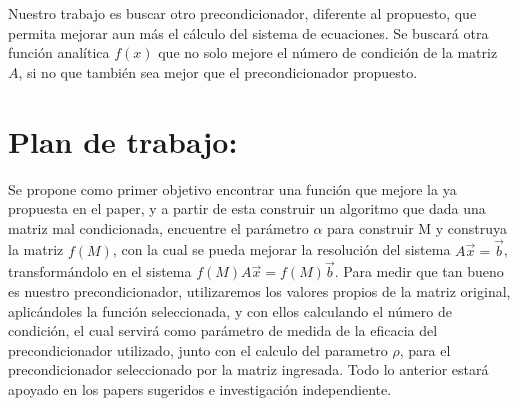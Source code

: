 \documentclass[fleqn]{article}
\begin{document}
Nuestro trabajo es buscar otro precondicionador, diferente al propuesto, que permita mejorar aun más el cálculo del sistema de ecuaciones. Se buscará otra función analítica $f(x)$ que no solo mejore el número de condición de la matriz $A$, si no que también sea mejor que el precondicionador propuesto.\newpage

\section{Plan de trabajo:}

Se propone como primer objetivo encontrar una función que mejore la ya propuesta en el paper, y a partir de esta construir un algoritmo que dada una matriz mal condicionada, encuentre el parámetro $\alpha$ para construir M y construya la matriz $f(M)$, con la cual se pueda mejorar la resolución del sistema $A\vec{x} = \vec{b}$, transformándolo en el sistema $f(M)A\vec{x} = f(M)\vec{b}$. Para medir que tan bueno es nuestro precondicionador, utilizaremos los valores propios de la matriz original, aplicándoles la función seleccionada, y con ellos calculando el número de condición, el cual servirá como parámetro de medida de la eficacia del precondicionador utilizado, junto con el calculo del parametro $\rho$, para el precondicionador seleccionado por la matriz ingresada. Todo lo anterior estará apoyado en los papers sugeridos e investigación independiente. 
\end{document}
